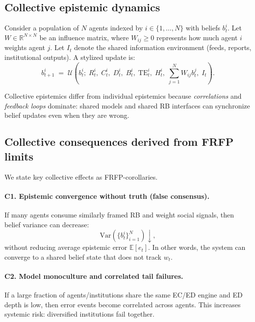 \subsection{Collective epistemic dynamics}
Consider a population of $N$ agents indexed by $i\in\{1,\dots,N\}$ with beliefs $b^i_t$. Let $W\in\mathbb{R}^{N\times N}$ be an influence matrix, where $W_{ij}\ge 0$ represents how much agent $i$ weights agent $j$. Let $I_t$ denote the shared information environment (feeds, reports, institutional outputs). A stylized update is:
\begin{equation}
b^i_{t+1} \;=\; \mathcal{U}\!\left(
b^i_t;\; R^i_t,\; C^i_t,\; D^i_t,\; B^i_t,\; \text{TE}^i_t,\; H^i_t,\;
\sum_{j=1}^N W_{ij} b^j_t,\; I_t
\right).
\label{eq:collective-update}
\end{equation}

Collective epistemics differ from individual epistemics because \emph{correlations} and \emph{feedback loops} dominate: shared models and shared RB interfaces can synchronize belief updates even when they are wrong.

\subsection{Collective consequences derived from FRFP limits}
We state key collective effects as FRFP-corollaries.

\paragraph{C1. Epistemic convergence without truth (false consensus).}
If many agents consume similarly framed RB and weight social signals, then belief variance can decrease:
\begin{equation}
\mathrm{Var}\!\left(\{b^i_t\}_{i=1}^N\right) \downarrow,
\end{equation}
without reducing average epistemic error $\mathbb{E}[e_t]$. In other words, the system can converge to a shared belief state that does not track $w_t$.

\paragraph{C2. Model monoculture and correlated tail failures.}
If a large fraction of agents/institutions share the same EC/ED engine and ED depth is low, then error events become correlated across agents. This increases systemic risk: diversified institutions fail together.

